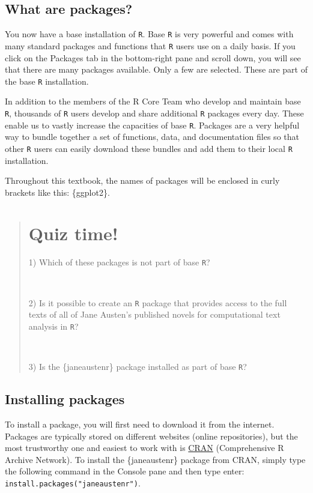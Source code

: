 \documentclass[
  letterpaper,
  DIV=11,
  numbers=noendperiod,
  oneside]{scrreprt}
\begin{document}
\subsection{What are packages?}\label{what-are-packages}

You now have a base installation of \texttt{R}. Base \texttt{R} is very
powerful and comes with many standard packages and functions that
\texttt{R} users use on a daily basis. If you click on the Packages tab
in the bottom-right pane and scroll down, you will see that there are
many packages available. Only a few are selected. These are part of the
base \texttt{R} installation.

In addition to the members of the R Core Team who develop and maintain
base \texttt{R}, thousands of \texttt{R} users develop and share
additional \texttt{R} packages every day. These enable us to vastly
increase the capacities of base \texttt{R}. Packages are a very helpful
way to bundle together a set of functions, data, and documentation files
so that other \texttt{R} users can easily download these bundles and add
them to their local \texttt{R} installation.

Throughout this textbook, the names of packages will be enclosed in
curly brackets like this: \{ggplot2\}.

\begin{quote}
\section*{Quiz time!}\label{quiz-time-1}


1) Which of these packages is not part of base \texttt{R}?

~

2) Is it possible to create an \texttt{R} package that provides access
to the full texts of all of Jane Austen's published novels for
computational text analysis in \texttt{R}?

~

3) Is the \{janeaustenr\} package installed as part of base \texttt{R}?
\end{quote}

\subsection{Installing packages}\label{installing-packages}

To install a package, you will first need to download it from the
internet. Packages are typically stored on different websites (online
repositories), but the most trustworthy one and easiest to work with is
\href{https://cran.rstudio.com/index.html}{CRAN} (Comprehensive R
Archive Network). To install the \{janeaustenr\} package from CRAN,
simply type the following command in the Console pane and then type
enter: \texttt{install.packages("janeaustenr")}.
\end{document}
